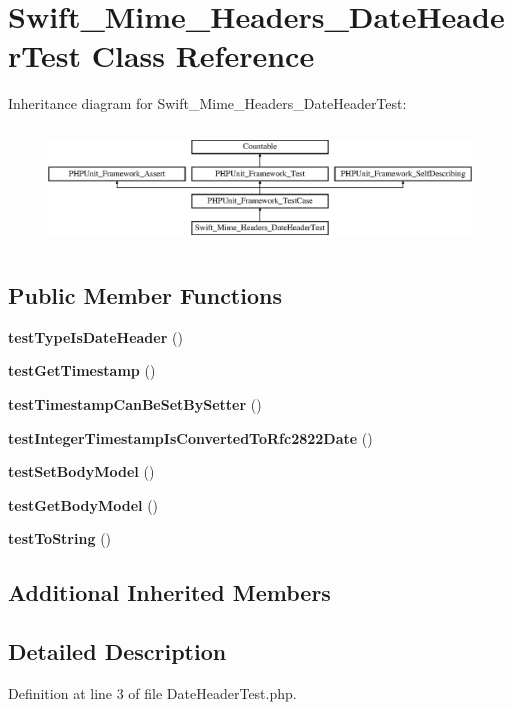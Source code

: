 \section{Swift\+\_\+\+Mime\+\_\+\+Headers\+\_\+\+Date\+Header\+Test Class Reference}
\label{class_swift___mime___headers___date_header_test}
Inheritance diagram for Swift\+\_\+\+Mime\+\_\+\+Headers\+\_\+\+Date\+Header\+Test\+:\begin{figure}[H]
\begin{center}
\leavevmode
\includegraphics[height=3.150492cm]{class_swift___mime___headers___date_header_test}
\end{center}
\end{figure}
\subsection*{Public Member Functions}
\begin{DoxyCompactItemize}
\item 
{\bf test\+Type\+Is\+Date\+Header} ()
\item 
{\bf test\+Get\+Timestamp} ()
\item 
{\bf test\+Timestamp\+Can\+Be\+Set\+By\+Setter} ()
\item 
{\bf test\+Integer\+Timestamp\+Is\+Converted\+To\+Rfc2822\+Date} ()
\item 
{\bf test\+Set\+Body\+Model} ()
\item 
{\bf test\+Get\+Body\+Model} ()
\item 
{\bf test\+To\+String} ()
\end{DoxyCompactItemize}
\subsection*{Additional Inherited Members}


\subsection{Detailed Description}


Definition at line 3 of file Date\+Header\+Test.\+php.



